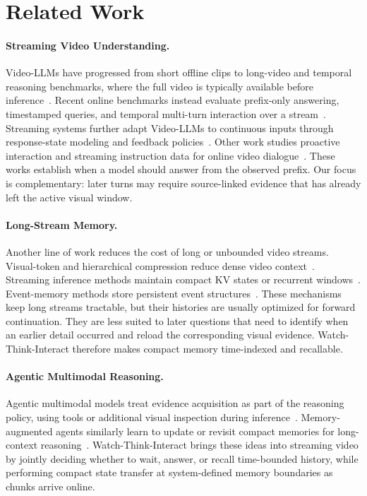 \section{Related Work}

\paragraph{Streaming Video Understanding.}
Video-LLMs have progressed from short offline clips to long-video and temporal reasoning benchmarks, where the full video is typically available before inference~\citep{mvbench2024,longvideobench2024,videomme2025}.
Recent online benchmarks instead evaluate prefix-only answering, timestamped queries, and temporal multi-turn interaction over a stream~\citep{ovobench2025,ovbench2025,svbench2025}.
Streaming systems further adapt Video-LLMs to continuous inputs through response-state modeling and feedback policies~\citep{videollm_online2024,dispider2025}.
Other work studies proactive interaction and streaming instruction data for online video dialogue~\citep{streambridge2025,streamo2026}.
These works establish when a model should answer from the observed prefix.
Our focus is complementary: later turns may require source-linked evidence that has already left the active visual window.

\paragraph{Long-Stream Memory.}
Another line of work reduces the cost of long or unbounded video streams.
Visual-token and hierarchical compression reduce dense video context~\citep{longvu2025,videochatflash2026}.
Streaming inference methods maintain compact KV states or recurrent windows~\citep{streamingvlm2026,flashvstream2025}.
Event-memory methods store persistent event structures~\citep{streamforest2025}.
These mechanisms keep long streams tractable, but their histories are usually optimized for forward continuation.
They are less suited to later questions that need to identify when an earlier detail occurred and reload the corresponding visual evidence.
Watch-Think-Interact therefore makes compact memory time-indexed and recallable.

\paragraph{Agentic Multimodal Reasoning.}
Agentic multimodal models treat evidence acquisition as part of the reasoning policy, using tools or additional visual inspection during inference~\citep{deepeyes2026,deepeyesv22026}.
Memory-augmented agents similarly learn to update or revisit compact memories for long-context reasoning~\citep{memagent2026,rememr12026}.
Watch-Think-Interact brings these ideas into streaming video by jointly deciding whether to wait, answer, or recall time-bounded history, while performing compact state transfer at system-defined memory boundaries as chunks arrive online.
